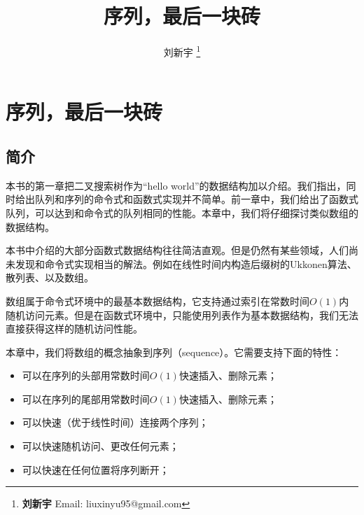 \documentclass[UTF8]{article}
\begin{document}


\title{序列，最后一块砖}

\author{刘新宇
\thanks{{\bfseries 刘新宇 } \newline
  Email: liuxinyu95@gmail.com \newline}
  }

\maketitle
\fi


\ifx\wholebook\relax
\chapter{序列，最后一块砖}
\fi

\section{简介}
\label{introduction}
本书的第一章把二叉搜索树作为“hello world”的数据结构加以介绍。我们指出，同时给出队列和序列的命令式和函数式实现并不简单。前一章中，我们给出了函数式队列，可以达到和命令式的队列相同的性能。本章中，我们将仔细探讨类似数组的数据结构。

本书中介绍的大部分函数式数据结构往往简洁直观。但是仍然有某些领域，人们尚未发现和命令式实现相当的解法。例如在线性时间内构造后缀树的Ukkonen算法、散列表、以及数组。

数组属于命令式环境中的最基本数据结构，它支持通过索引在常数时间$O(1)$内随机访问元素。但是在函数式环境中，只能使用列表作为基本数据结构，我们无法直接获得这样的随机访问性能。

本章中，我们将数组的概念抽象到序列（sequence）。它需要支持下面的特性：

\begin{itemize}
\item 可以在序列的头部用常数时间$O(1)$快速插入、删除元素；
\item 可以在序列的尾部用常数时间$O(1)$快速插入、删除元素；
\item 可以快速（优于线性时间）连接两个序列；
\item 可以快速随机访问、更改任何元素；
\item 可以快速在任何位置将序列断开；
\end{itemize}
\end{document}
